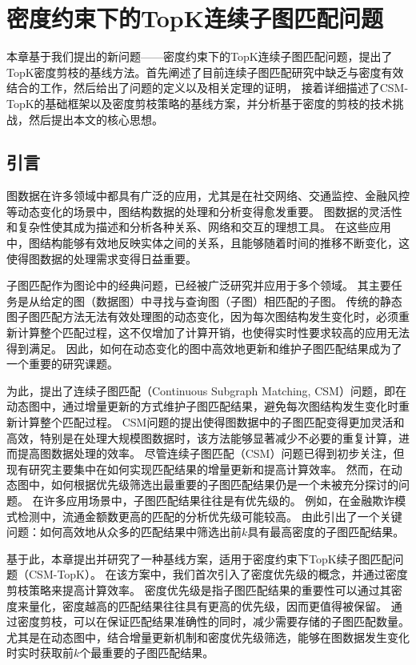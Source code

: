 \chapter{密度约束下的TopK连续子图匹配问题}
\label{ch3}
本章基于我们提出的新问题——密度约束下的TopK连续子图匹配问题，提出了TopK密度剪枝的基线方法。首先阐述了目前连续子图匹配研究中缺乏与密度有效结合的工作，然后给出了问题的定义以及相关定理的证明，
接着详细描述了CSM-TopK的基础框架以及密度剪枝策略的基线方案，并分析基于密度的剪枝的技术挑战，然后提出本文的核心思想。
\section{引言}
\label{ch3:introduction}
图数据在许多领域中都具有广泛的应用，尤其是在社交网络、交通监控、金融风控等动态变化的场景中，图结构数据的处理和分析变得愈发重要。
图数据的灵活性和复杂性使其成为描述和分析各种关系、网络和交互的理想工具。
在这些应用中，图结构能够有效地反映实体之间的关系，且能够随着时间的推移不断变化，这使得图数据的处理需求变得日益重要。

子图匹配作为图论中的经典问题，已经被广泛研究并应用于多个领域。
其主要任务是从给定的图（数据图）中寻找与查询图（子图）相匹配的子图。
传统的静态图子图匹配方法无法有效处理图的动态变化，因为每次图结构发生变化时，必须重新计算整个匹配过程，这不仅增加了计算开销，也使得实时性要求较高的应用无法得到满足。
因此，如何在动态变化的图中高效地更新和维护子图匹配结果成为了一个重要的研究课题。

为此，提出了连续子图匹配（Continuous Subgraph Matching, CSM）问题，即在动态图中，通过增量更新的方式维护子图匹配结果，避免每次图结构发生变化时重新计算整个匹配过程。
CSM问题的提出使得图数据中的子图匹配变得更加灵活和高效，特别是在处理大规模图数据时，该方法能够显著减少不必要的重复计算，进而提高图数据处理的效率。
尽管连续子图匹配（CSM）问题已得到初步关注，但现有研究主要集中在如何实现匹配结果的增量更新和提高计算效率。
然而，在动态图中，如何根据优先级筛选出最重要的子图匹配结果仍是一个未被充分探讨的问题。
在许多应用场景中，子图匹配结果往往是有优先级的。
例如，在金融欺诈模式检测中，流通金额数更高的匹配的分析优先级可能较高。
由此引出了一个关键问题：如何高效地从众多的匹配结果中筛选出前$k$具有最高密度的子图匹配结果。

基于此，本章提出并研究了一种基线方案，适用于密度约束下TopK续子图匹配问题（CSM-TopK）。
在该方案中，我们首次引入了密度优先级的概念，并通过密度剪枝策略来提高计算效率。
密度优先级是指子图匹配结果的重要性可以通过其密度来量化，密度越高的匹配结果往往具有更高的优先级，因而更值得被保留。
通过密度剪枝，可以在保证匹配结果准确性的同时，减少需要存储的子图匹配数量。
尤其是在动态图中，结合增量更新机制和密度优先级筛选，能够在图数据发生变化时实时获取前$k$个最重要的子图匹配结果。
